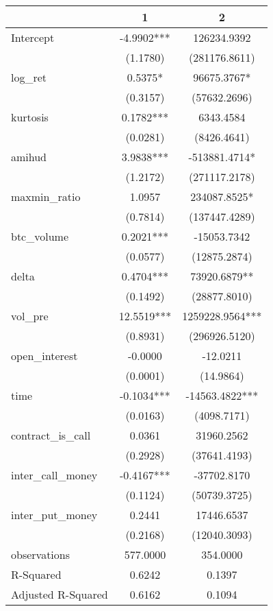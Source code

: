 \begin{tabular}{lcc}
\hline
                   &     1      &        2         \\
\midrule
\midrule
Intercept          & -4.9902*** & 126234.9392      \\
                   & (1.1780)   & (281176.8611)    \\
log\_ret           & 0.5375*    & 96675.3767*      \\
                   & (0.3157)   & (57632.2696)     \\
kurtosis           & 0.1782***  & 6343.4584        \\
                   & (0.0281)   & (8426.4641)      \\
amihud             & 3.9838***  & -513881.4714*    \\
                   & (1.2172)   & (271117.2178)    \\
maxmin\_ratio      & 1.0957     & 234087.8525*     \\
                   & (0.7814)   & (137447.4289)    \\
btc\_volume        & 0.2021***  & -15053.7342      \\
                   & (0.0577)   & (12875.2874)     \\
delta              & 0.4704***  & 73920.6879**     \\
                   & (0.1492)   & (28877.8010)     \\
vol\_pre           & 12.5519*** & 1259228.9564***  \\
                   & (0.8931)   & (296926.5120)    \\
open\_interest     & -0.0000    & -12.0211         \\
                   & (0.0001)   & (14.9864)        \\
time               & -0.1034*** & -14563.4822***   \\
                   & (0.0163)   & (4098.7171)      \\
contract\_is\_call & 0.0361     & 31960.2562       \\
                   & (0.2928)   & (37641.4193)     \\
inter\_call\_money & -0.4167*** & -37702.8170      \\
                   & (0.1124)   & (50739.3725)     \\
inter\_put\_money  & 0.2441     & 17446.6537       \\
                   & (0.2168)   & (12040.3093)     \\
observations       & 577.0000   & 354.0000         \\
R-Squared          & 0.6242     & 0.1397           \\
Adjusted R-Squared & 0.6162     & 0.1094           \\
\hline
\end{tabular}